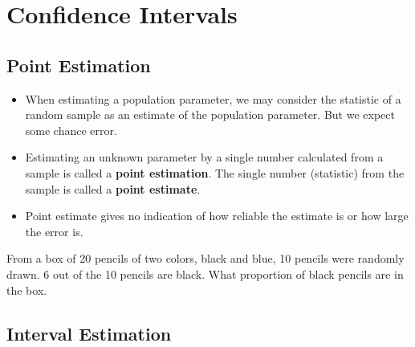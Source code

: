 
\hypertarget{confidence-intervals}{%
\section{Confidence Intervals}\label{confidence-intervals}}

\hypertarget{point-estimation}{%
\subsection{Point Estimation}\label{point-estimation}}

\begin{itemize}
\item
  When estimating a population parameter, we may consider the statistic
  of a random sample as an estimate of the population parameter. But we
  expect some chance error.
\item
  Estimating an unknown parameter by a single number calculated from a
  sample is called a \textbf{point estimation}. The single number
  (statistic) from the sample is called a \textbf{point estimate}.
\item
  Point estimate gives no indication of how reliable the estimate is or
  how large the error is.
\end{itemize}

\begin{example}

From a box of 20 pencils of two colors, black and blue, 10 pencils were
randomly drawn. 6 out of the 10 pencils are black. What proportion of
black pencils are in the box.

\end{example}
\vspace*{6\baselineskip}


\hypertarget{interval-estimation}{%
\subsection{Interval Estimation}\label{interval-estimation}}

